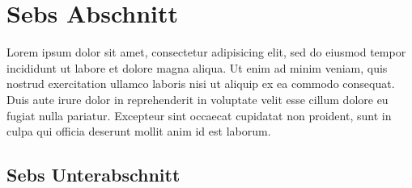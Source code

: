 \section{Sebs Abschnitt}
\renewcommand\mitautor{Sebastian XXXXXX}

Lorem ipsum dolor sit amet, consectetur adipisicing elit, sed do eiusmod
tempor incididunt ut labore et dolore magna aliqua. Ut enim ad minim veniam,
quis nostrud exercitation ullamco laboris nisi ut aliquip ex ea commodo
consequat. Duis aute irure dolor in reprehenderit in voluptate velit esse
cillum dolore eu fugiat nulla pariatur. Excepteur sint occaecat cupidatat non
proident, sunt in culpa qui officia deserunt mollit anim id est laborum.

\subsection{Sebs Unterabschnitt}


\newpage